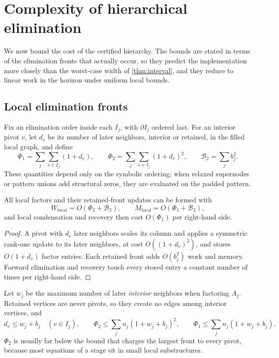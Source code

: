 \section{Complexity of hierarchical elimination}\label{sec:complexity}

We now bound the cost of the certified hierarchy. The bounds are stated in terms
of the elimination fronts that actually occur, so they predict the implementation
more closely than the worst-case width of \cref{thm:interval}, and they reduce to
linear work in the horizon under uniform local bounds.

\subsection{Local elimination fronts}\label{sec:local}

Fix an elimination order inside each $I_j$, with $\partial I_j$ ordered last. For
an interior pivot $v$, let $d_v$ be its number of later neighbors, interior or
retained, in the filled local graph, and define
\begin{equation}\label{eq:phi}
\Phi_1=\sum_j\sum_{v\in I_j}(1+d_v),\qquad
\Phi_2=\sum_j\sum_{v\in I_j}(1+d_v)^2,\qquad
\mathcal B_2=\sum_jb_j^2.
\end{equation}
These quantities depend only on the symbolic ordering; when relaxed supernodes or
pattern unions add structural zeros, they are evaluated on the padded pattern.

\begin{lemma}\label{lem:local}
All local factors and their retained-front updates can be formed with
\begin{equation}\label{eq:local-cost}
W_{\mathrm{local}}=O(\Phi_2+\mathcal B_2),\qquad M_{\mathrm{local}}=O(\Phi_1+\mathcal B_2),
\end{equation}
and local condensation and recovery then cost $O(\Phi_1)$ per right-hand side.
\end{lemma}

\begin{proof}
A pivot with $d_v$ later neighbors scales its column and applies a symmetric
rank-one update to its later neighbors, at cost $O((1+d_v)^2)$, and stores
$O(1+d_v)$ factor entries. Each retained front adds $O(b_j^2)$ work and memory.
Forward elimination and recovery touch every stored entry a constant number of
times per right-hand side.
\end{proof}

Let $w_j$ be the maximum number of later \emph{interior} neighbors when factoring
$A_j$. Retained vertices are never pivots, so they create no edges among interior
vertices, and
\begin{equation}\label{eq:dv}
d_v\le w_j+b_j\quad(v\in I_j),\qquad
\Phi_2\le\sum_jn_j(1+w_j+b_j)^2,\qquad
\Phi_1\le\sum_jn_j(1+w_j+b_j).
\end{equation}
$\Phi_2$ is usually far below the bound that charges the largest front to every
pivot, because most equations of a stage sit in small local substructures.

